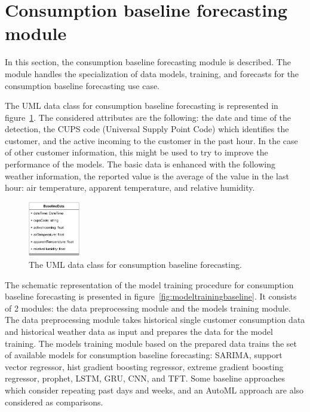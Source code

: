 \section{Consumption baseline forecasting module}
\label{sec:baselinemodel}
\vspace{0.2 cm}

In this section, the consumption baseline forecasting module is described.
The module handles the specialization of data models, training, and forecasts for the consumption baseline forecasting use case.

The UML data class for consumption baseline forecasting is represented in figure~\ref{fig:umlbaseline}.
The considered attributes are the following: the date and time of the detection, the CUPS code (Universal Supply Point Code) which identifies the customer, and the active incoming to the customer in the past hour.
In the case of other customer information, this might be used to try to improve the performance of the models.
The basic data is enhanced with the following weather information, the reported value is the average of the value in the last hour: air temperature, apparent temperature, and relative humidity.

\begin{figure}[H]
\centering
\includegraphics[width=0.20\textwidth]{images/baseline_uml}
\caption{The UML data class for consumption baseline forecasting.}
\label{fig:umlbaseline}
\end{figure}

The schematic representation of the model training procedure for consumption baseline forecasting is presented in figure~\ref{fig:modeltrainingbaseline}.
It consists of 2 modules: the data preprocessing module and the models training module.
The data preprocessing module takes historical single customer consumption data and historical weather data as input and prepares the data for the model training.
The models training module based on the prepared data trains the set of available models for consumption baseline forecasting: SARIMA, support vector regressor, hist gradient boosting regressor, extreme gradient boosting regressor, prophet, LSTM, GRU, CNN, and TFT.
Some baseline approaches which consider repeating past days and weeks, and an AutoML approach are also considered as comparisons.

